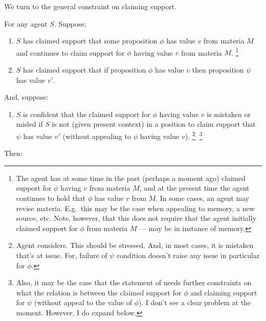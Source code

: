 \begin{note}[\nI{}]
  We turn to the general constraint on claiming support.
  \begin{proposition}[\nI{-}  --- \nI{}]\label{prem:ni}
    For any agent \(S\).
    Suppose:
    \begin{enumerate}[ref=(\textsf{NI}:\arabic*), series=nI_counter]
    \item\label{nI:claimed-support} \(S\) has claimed support that some proposition \(\phi\) has value \(v\) from materia \(M\) and continues to claim support for \(\phi\) having value \(v\) from materia \(M\).\nolinebreak
      \footnote{
        The agent has at some time in the past (perhaps a moment ago) claimed support for \(\phi\) having \(v\) from materia \(M\), and at the present time the agent continues to hold that \(\phi\) has value \(v\) from \(M\).
        In some cases, an agent may revise materia.
        E.g.\ this may be the case when appealing to memory, a new source, etc.
        Note, however, that this does not require that the agent initially claimed support for \(\phi\) from materia \(M\) --- may be in instance of memory.
      }
    \item\label{nI:received-info} \(S\) has claimed support that if proposition \(\phi\) has value \(v\) then proposition \(\psi\) has value \(v'\).
    \end{enumerate}
    And, suppose:
    \begin{enumerate}[ref=(\textsf{NI}:\arabic*), resume*=nI_counter]
    \item\label{nI:inclusion} \(S\) is confident that the claimed support for \(\phi\) having value \(v\) is mistaken or misled if \(S\) is not (given present context) in a position to claim support that \(\psi\) has value \(v'\) (without appealing to \(\phi\) having value \(v\)).\nolinebreak
      \footnote{
        Agent considers.
        This should be stressed.
        And, in most cases, it is mistaken that's at issue.
        For, failure of \(\psi\) condition doesn't raise any issue in particular for \(\phi\).
      }\(^{,}\)\nolinebreak
      \footnote{
        Also, it may be the case that the statement of \nI{} needs further constraints on what the relation is between the claimed support for \(\phi\) and claiming support for \(\psi\) (without appeal to the value of \(\phi\)).
        I don't see a clear problem at the moment.
        However, I do expand below.
      }
    \end{enumerate}
    Then:
    \begin{enumerate}[ref=(\textsf{NI}:\arabic*), resume*=nI_counter]

\end{enumerate}
\end{proposition}
\end{note}
